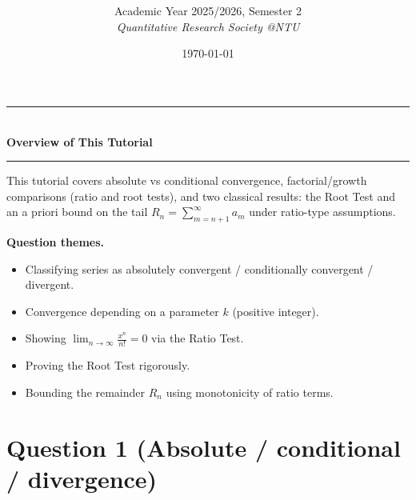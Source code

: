 \documentclass[12pt]{article}
\title{
\CourseCode \CourseName \\[0.3em]
\large \DocType
}
\author{
  Academic Year 2025/2026, Semester 2 \\[0.25em]
  \textit{Quantitative Research Society @NTU}
}
\date{\today}
\begin{document}
\maketitle
\thispagestyle{plainfirst}
\pagestyle{main}
\bigskip

\begin{center}
  \rule{0.8\textwidth}{0.4pt}\\[4pt]
  \textbf{Overview of This Tutorial}\\[2pt]
  \rule{0.8\textwidth}{0.4pt}
\end{center}

\noindent
This tutorial covers absolute vs conditional convergence, factorial/growth comparisons (ratio and root tests), and two classical results: the Root Test and an a priori bound on the tail \(R_n=\sum_{m=n+1}^\infty a_m\) under ratio-type assumptions.

\noindent
\textbf{Question themes.}
\begin{itemize}[leftmargin=*]
  \item Classifying series as absolutely convergent / conditionally convergent / divergent.
  \item Convergence depending on a parameter \(k\) (positive integer).
  \item Showing \(\lim_{n\to\infty}\frac{x^n}{n!}=0\) via the Ratio Test.
  \item Proving the Root Test rigorously.
  \item Bounding the remainder \(R_n\) using monotonicity of ratio terms.
\end{itemize}

\bigskip

\newpage
\section*{Question 1 (Absolute / conditional / divergence)}
\end{document}

